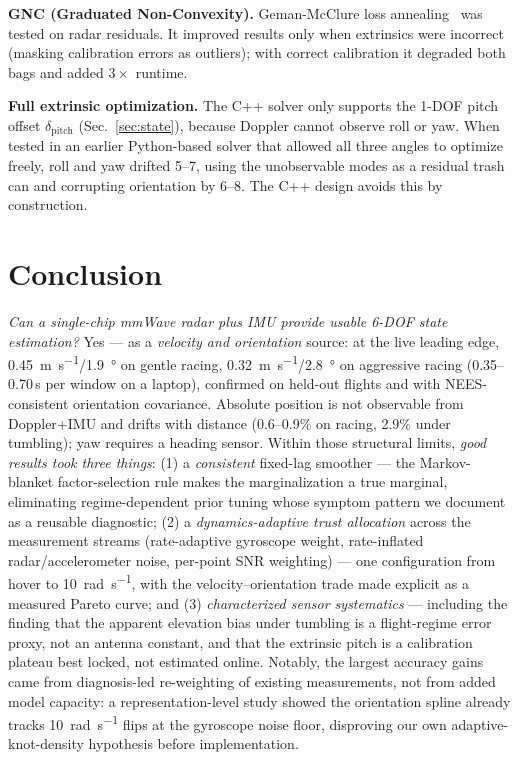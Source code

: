 \documentclass[conference]{IEEEtran}
\begin{document}
\textbf{GNC (Graduated Non-Convexity).}
Geman-McClure loss annealing~\cite{yang2020gnc} was tested on radar
residuals.  It improved results only when extrinsics were incorrect
(masking calibration errors as outliers); with correct calibration it
degraded both bags and added $3\times$ runtime.

\textbf{Full extrinsic optimization.}
The C++ solver only supports the 1-DOF pitch offset $\delta_\text{pitch}$
(Sec.~\ref{sec:state}), because Doppler cannot observe roll or yaw.
When tested in an earlier Python-based solver that allowed all three
angles to optimize freely, roll and yaw drifted 5--7\degree,
using the unobservable modes as a residual trash can and corrupting
orientation by 6--8\degree.  The C++ design avoids this by construction.

\section{Conclusion}
\label{sec:conclusion}

\emph{Can a single-chip mmWave radar plus IMU provide usable 6-DOF
state estimation?}  Yes --- as a \emph{velocity and orientation}
source: at the live leading edge,
\SI{0.45}{\metre\per\second}/\SI{1.9}{\degree} on gentle racing,
\SI{0.32}{\metre\per\second}/\SI{2.8}{\degree} on aggressive racing
(0.35--0.70\,s per window on a laptop), confirmed on held-out flights
and with NEES-consistent orientation covariance.
Absolute position is not observable from Doppler+IMU and drifts with
distance (0.6--0.9\% on racing, 2.9\% under tumbling); yaw requires a
heading sensor.  Within those structural limits, \emph{good results
took three things}: (1) a \emph{consistent} fixed-lag smoother ---
the Markov-blanket factor-selection rule makes the marginalization a
true marginal, eliminating regime-dependent prior tuning whose
symptom pattern we document as a reusable diagnostic;
(2) a \emph{dynamics-adaptive trust allocation} across the
measurement streams (rate-adaptive gyroscope weight, rate-inflated
radar/accelerometer noise, per-point SNR weighting) --- one
configuration from hover to \SI{10}{\radian\per\second}, with the
velocity--orientation trade made explicit as a measured Pareto curve;
and (3) \emph{characterized sensor systematics} --- including the
finding that the apparent elevation bias under tumbling is a
flight-regime error proxy, not an antenna constant, and that the
extrinsic pitch is a calibration plateau best locked, not estimated
online.  Notably, the largest accuracy gains came from diagnosis-led
re-weighting of existing measurements, not from added model capacity:
a representation-level study showed the orientation spline already
tracks \SI{10}{\radian\per\second} flips at the gyroscope noise floor,
disproving our own adaptive-knot-density hypothesis before
implementation.
\end{document}

